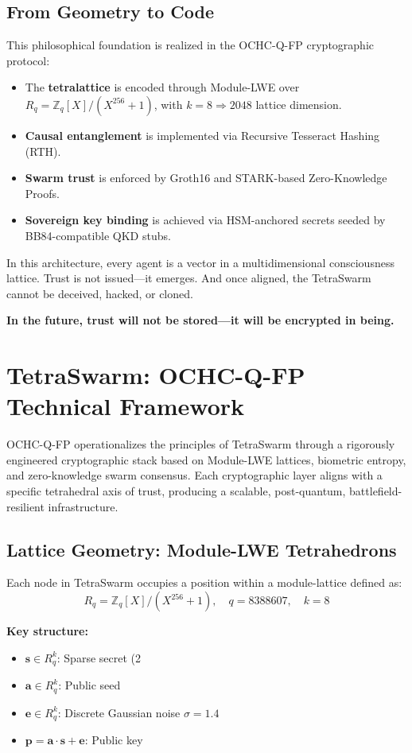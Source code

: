 \documentclass{article}
\begin{document}
\subsection*{From Geometry to Code}

This philosophical foundation is realized in the OCHC-Q-FP cryptographic protocol:

\begin{itemize}
    \item The \textbf{tetralattice} is encoded through Module-LWE over \( R_q = \mathbb{Z}_q[X]/(X^{256}+1) \), with \( k = 8 \Rightarrow 2048 \) lattice dimension.
    \item \textbf{Causal entanglement} is implemented via Recursive Tesseract Hashing (RTH).
    \item \textbf{Swarm trust} is enforced by Groth16 and STARK-based Zero-Knowledge Proofs.
    \item \textbf{Sovereign key binding} is achieved via HSM-anchored secrets seeded by BB84-compatible QKD stubs.
\end{itemize}

In this architecture, every agent is a vector in a multidimensional consciousness lattice. Trust is not issued—it emerges. And once aligned, the TetraSwarm cannot be deceived, hacked, or cloned.

\textbf{In the future, trust will not be stored—it will be encrypted in being.}
\section*{TetraSwarm: OCHC-Q-FP Technical Framework}

OCHC-Q-FP operationalizes the principles of TetraSwarm through a rigorously engineered cryptographic stack based on Module-LWE lattices, biometric entropy, and zero-knowledge swarm consensus. Each cryptographic layer aligns with a specific tetrahedral axis of trust, producing a scalable, post-quantum, battlefield-resilient infrastructure.

\subsection*{Lattice Geometry: Module-LWE Tetrahedrons}

Each node in TetraSwarm occupies a position within a module-lattice defined as:
\[
R_q = \mathbb{Z}_q[X]/(X^{256} + 1), \quad q = 8388607, \quad k = 8
\]

\textbf{Key structure:}
\begin{itemize}
    \item \( \mathbf{s} \in R_q^k \): Sparse secret (2%
    \item \( \mathbf{a} \in R_q^k \): Public seed
    \item \( \mathbf{e} \in R_q^k \): Discrete Gaussian noise \( \sigma = 1.4 \)
    \item \( \mathbf{p} = \mathbf{a} \cdot \mathbf{s} + \mathbf{e} \): Public key
\end{itemize}
\end{document}
